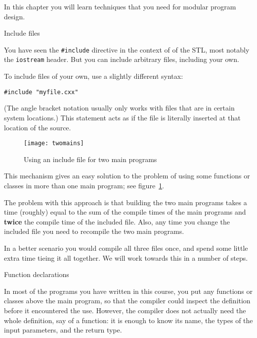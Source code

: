 
In this chapter you will learn techniques
that you need for modular program design.

 {Include files}

You have seen the \lstinline+#include+ directive
in the context of 
of the \ac{STL}, most notably the \lstinline{iostream} header.
But you can include arbitrary files, including your own.

To include files of your own, use a slightly different syntax:
\begin{lstlisting}
#include "myfile.cxx"
\end{lstlisting}
(The angle bracket notation usually only works
with files that are in certain system locations.)
This statement acts as if the file
is literally inserted at that location of the source.

\begin{figure}[ht]
  \texttt{[image: twomains]}
  \caption{Using an include file for two main programs}
  \label{fig:twomains}
\end{figure}
This mechanism gives an easy solution to the problem
of using some functions or classes in more than one main program;
see figure~\ref{fig:twomains}.

The problem with this approach is that building the two main programs
takes a time (roughly) equal to
the sum of the compile times of the main programs
and \textbf{twice} the compile time of the included file.
Also, any time you change the included file
you need to recompile the two main programs.

In a better scenario you would compile all three files once,
and spend some little extra time tieing it all together.
We will work towards this in a number of steps.

 {Function declarations}
\label{sec:proto}

In most of the programs you have written in this course, you put any
functions or classes above the main program, so that the compiler
could inspect the definition before it encountered the use. However,
the compiler does not actually need the whole definition, say of a
function: it is enough to know its name, the types of the input
parameters, and the return type.

